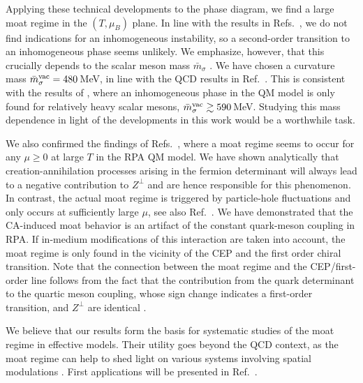 \documentclass[reprint,english,superscriptaddress,preprintnumbers,amsmath,amssymb,aps,prd]{revtex4-2}
\begin{document}
Applying these technical developments to the phase diagram, we find a large moat regime in the $(T,\mu_B)$ plane. In line with the results in Refs.\ \cite{Topfel:2024iop,Cao:2025zvh}, we do not find indications for an inhomogeneous instability, so a second-order transition to an inhomogeneous phase seems unlikely. We emphasize, however, that this crucially depends to the scalar meson mass $\bar m_\sigma$ \cite{Carignano:2014jla}. We have chosen a curvature mass $\bar m_\sigma^{\rm vac} = 480$\,MeV, in line with the QCD results in Ref.\ \cite{Fu:2019hdw}. This is consistent with the results of \cite{Carignano:2014jla}, where an inhomogeneous phase in the QM model is only found for relatively heavy scalar mesons, $\bar m_\sigma^{\rm vac} \gtrsim 590$\,MeV. Studying this mass dependence in light of the developments in this work would be a worthwhile task.

We also confirmed the findings of Refs.\ \cite{Topfel:2024iop,Cao:2025zvh}, where a moat regime seems to occur for any $\mu\geq 0$ at large $T$ in the RPA QM model. We have shown analytically that creation-annihilation processes arising in the fermion determinant will always lead to a negative contribution to $Z^\perp$ and are hence responsible for this phenomenon. In contrast, the actual moat regime is triggered by particle-hole fluctuations and only occurs at sufficiently large $\mu$, see also Ref.\ \cite{Fu:2024rto}. We have demonstrated that the CA-induced moat behavior is an artifact of the constant quark-meson coupling in RPA. If in-medium modifications of this interaction are taken into account, the moat regime is only found in the vicinity of the CEP and the first order chiral transition. Note that the connection between the moat regime and the CEP/first-order line follows from the fact that the contribution from the quark determinant to the quartic meson coupling, whose sign change indicates a first-order transition, and $Z^\perp$ are identical \cite{Nickel:2009ke}.

We believe that our results form the basis for systematic studies of the moat regime in effective models. Their utility goes beyond the QCD context, as the moat regime can help to shed light on various systems involving spatial modulations \cite{Pisarski:2021qof, Rennecke:2021ovl, Nussinov:2024erh}. First applications will be presented in Ref.\ \cite{DM2}.



\vspace{1ex}
\end{document}
